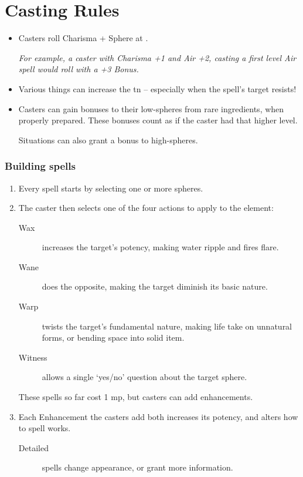 
\chapter{Casting Rules}

\begin{multicols}{2}

\begin{itemize}
  \item
  Casters roll Charisma + Sphere at \tn[7].

  \textit{For example, a caster with Charisma +1 and Air +2, casting a first level Air spell would roll with a +3 Bonus.}
  \item
  Various things can increase the \gls{tn} -- especially when the spell's target resists!
  \item
  Casters can gain bonuses to their low-spheres from rare ingredients, when properly prepared.
  These bonuses count as if the caster had that higher level.

  Situations can also grant a bonus to high-spheres.
\end{itemize}

\subsection{Building spells}

\begin{enumerate}
  \item
  Every spell starts by selecting one or more spheres.
  \item
  The caster then selects one of the four actions to apply to the element:
  \begin{description}
    \item[Wax]
    increases the target's potency, making water ripple and fires flare.
    \item[Wane]
    does the opposite, making the target diminish its basic nature.
    \item[Warp]
    twists the target's fundamental nature, making life take on unnatural forms, or bending space into solid item.
    \item[Witness]
    allows a single `yes/no' question about the target sphere.
  \end{description}
  These spells so far cost 1 \gls{mp}, but casters can add enhancements.
  \item
  Each Enhancement the casters add both increases its potency, and alters how to spell works.
  \begin{description}
    \item[Detailed]
    spells change appearance, or grant more information.


\end{description}
\end{enumerate}
\end{multicols}
